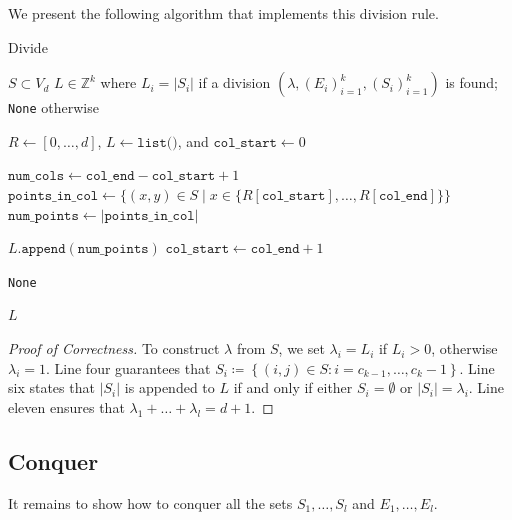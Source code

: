 We present the following algorithm that implements this division rule.


\begin{algorithm}[H]
\caption{Divide}
\label{alg:divide}
\begin{algorithmic}[1]
\Require \( S \subset V_d \)
\Ensure \( L \in \mathbb{Z}^{k} \) where \( L_i = \lvert S_i \rvert \) if a division \( (\lambda, (E_i)_{i=1}^k, (S_i)_{i=1}^k) \) is found; \texttt{None} otherwise

\State $R \gets [0, \dots, d]$, $L \gets \texttt{list()}$, and $\texttt{col\_start} \gets 0$

    \State $\texttt{num\_cols} \gets \texttt{col\_end} - \texttt{col\_start} + 1$
    \State $\texttt{points\_in\_col} \gets \{(x,y) \in S \mid x \in \{R[\texttt{col\_start}], \dots,  R[\texttt{col\_end}] \} \}$
    \State $\texttt{num\_points} \gets |\texttt{points\_in\_col}|$

        \State $L.\texttt{append}(\texttt{num\_points})$
        \State $\texttt{col\_start} \gets \texttt{col\_end} + 1$
    \EndIf
\EndFor

    \State \Return \texttt{None}
\EndIf

\State \Return $L$
\end{algorithmic}
\end{algorithm}

\begin{proof}[Proof of Correctness]
    To construct \( \lambda  \) from \( S \), we set \( \lambda_i = L_i \) if \( L_i > 0 \), otherwise \( \lambda_i = 1 \).
    Line four guarantees that \( S_i \coloneqq \left\{ (i,j) \in S : i = c_{k-1}, \dots, c_k - 1 \right\} \). Line six states that \( \lvert S_i \rvert \) is appended to \( L \) if and only if either \( S_i = \emptyset \) or \( \lvert S_i \rvert = \lambda_i \). Line eleven ensures that \(  \lambda_1 + \dots + \lambda_l = d+1  \).
\end{proof}




\subsection*{Conquer}

It remains to show how to conquer all the sets \( S_1, \dots, S_l \) and \( E_1, \dots, E_l \).

